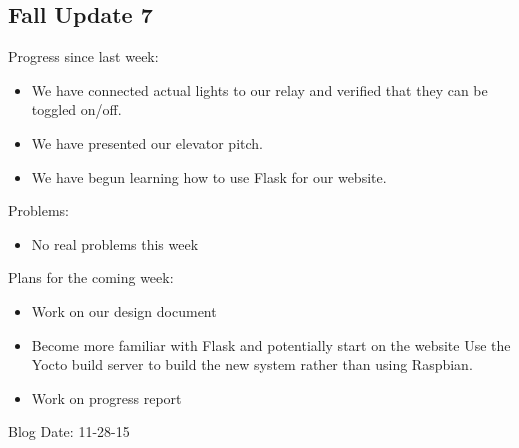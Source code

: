 \subsection{Fall Update 7}
Progress since last week:
\begin{itemize}
   \item We have connected actual lights to our relay and verified that they can be toggled on/off.
   \item We have presented our elevator pitch.
   \item We have begun learning how to use Flask for our website.
\end{itemize}
Problems:
\begin{itemize}
   \item No real problems this week
\end{itemize}
Plans for the coming week:
\begin{itemize}
   \item Work on our design document​
   \item Become more familiar with Flask and potentially start on the website
      Use the Yocto build server to build the new system rather than using Raspbian.
   \item Work on progress report
\end{itemize}
Blog Date: 11-28-15


